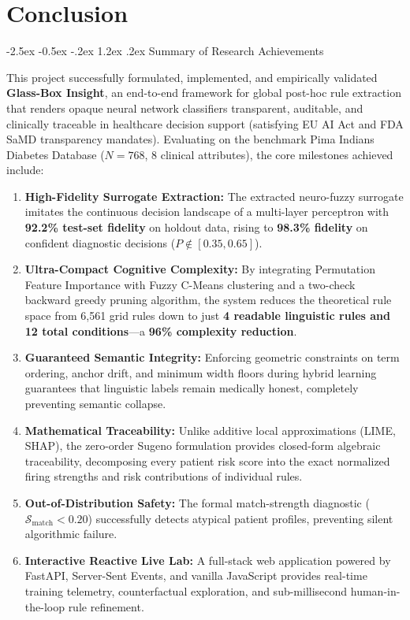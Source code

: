 \documentclass[12pt,a4paper,oneside]{report}
\makeatletter
\renewcommand\section{\@startsection {section}{1}{\z@}%
                                   {-2.5ex \@plus -0.5ex \@minus -.2ex}%
                                   {1.2ex \@plus .2ex}%
                                   {\normalfont\fontsize{13}{16}\selectfont\bfseries}}
\makeatother
\begin{document}
\chapter{Conclusion}

\section{Summary of Research Achievements}

This project successfully formulated, implemented, and empirically validated \textbf{Glass-Box Insight}, an end-to-end framework for global post-hoc rule extraction that renders opaque neural network classifiers transparent, auditable, and clinically traceable in healthcare decision support (satisfying EU AI Act and FDA SaMD transparency mandates). Evaluating on the benchmark Pima Indians Diabetes Database ($N=768$, 8 clinical attributes), the core milestones achieved include:
\begin{enumerate}
    \setlength{\itemsep}{0pt}
    \setlength{\parskip}{0pt}
    \item \textbf{High-Fidelity Surrogate Extraction:} The extracted neuro-fuzzy surrogate imitates the continuous decision landscape of a multi-layer perceptron with \textbf{92.2\% test-set fidelity} on holdout data, rising to \textbf{98.3\% fidelity} on confident diagnostic decisions ($P \notin [0.35, 0.65]$).
    \item \textbf{Ultra-Compact Cognitive Complexity:} By integrating Permutation Feature Importance with Fuzzy C-Means clustering and a two-check backward greedy pruning algorithm, the system reduces the theoretical rule space from 6,561 grid rules down to just \textbf{4 readable linguistic rules and 12 total conditions}—a \textbf{96\% complexity reduction}.
    \item \textbf{Guaranteed Semantic Integrity:} Enforcing geometric constraints on term ordering, anchor drift, and minimum width floors during hybrid learning guarantees that linguistic labels remain medically honest, completely preventing semantic collapse.
    \item \textbf{Mathematical Traceability:} Unlike additive local approximations (LIME, SHAP), the zero-order Sugeno formulation provides closed-form algebraic traceability, decomposing every patient risk score into the exact normalized firing strengths and risk contributions of individual rules.
    \item \textbf{Out-of-Distribution Safety:} The formal match-strength diagnostic ($\mathcal{S}_{\text{match}} < 0.20$) successfully detects atypical patient profiles, preventing silent algorithmic failure.
    \item \textbf{Interactive Reactive Live Lab:} A full-stack web application powered by FastAPI, Server-Sent Events, and vanilla JavaScript provides real-time training telemetry, counterfactual exploration, and sub-millisecond human-in-the-loop rule refinement.
\end{enumerate}
\end{document}
